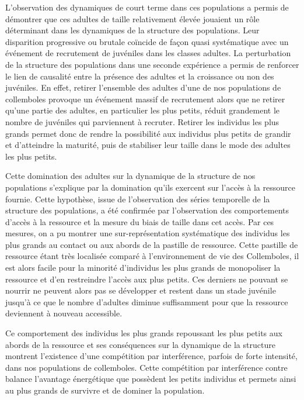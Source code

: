 L'observation des dynamiques de court terme dans ces populations a permis de
démontrer que ces adultes de taille relativement élevée jouaient un rôle
déterminant dans les dynamiques de la structure des populations. Leur
disparition progressive ou brutale coïncide de façon quasi systématique avec un
événement de recrutement de juvéniles dans les classes adultes. La perturbation
de la structure des populations dans une seconde expérience a permis de
renforcer le lien de causalité entre la présence des adultes et la croissance ou
non des juvéniles. En effet, retirer l'ensemble des adultes d'une de nos
populations de collemboles provoque un événement massif de recrutement alors que
ne retirer qu'une partie des adultes, en particulier les plus petits, réduit
grandement le nombre de juvéniles qui parviennent à recruter. Retirer les
individus les plus grands permet donc de rendre la possibilité aux individus
plus petits de grandir et d'atteindre la maturité, puis de stabiliser leur
taille dans le mode des adultes les plus petits. 

Cette domination des adultes sur la dynamique de la structure de nos populations
s'explique par la domination qu'ils exercent sur l'accès à la ressource fournie.
Cette hypothèse, issue de l'observation des séries temporelle de la structure
des populations, a été confirmée par l'observation des comportements d'accès à
la ressource et la mesure du biais de taille dans cet accès. Par ces mesures, on
a pu montrer une sur-représentation systématique des individus les plus grands
au contact ou aux abords de la pastille de ressource. Cette pastille de
ressource étant très localisée comparé à l'environnement de vie des Collemboles,
il est alors facile pour la minorité d'individus les plus grands de monopoliser
la ressource et d'en restreindre l'accès aux plus petits. Ces derniers ne
pouvant se nourrir ne peuvent alors pas se développer et restent dans un stade
juvénile jusqu'à ce que le nombre d'adultes diminue suffisamment pour que la
ressource deviennent à nouveau accessible. 

Ce comportement des individus les plus grands repoussant les plus petits aux
abords de la ressource et ses conséquences sur la dynamique de la structure
montrent l'existence d'une compétition par interférence, parfois de forte
intensité, dans nos populations de collemboles. Cette compétition par
interférence contre balance l'avantage énergétique que possèdent les petits
individus et permets ainsi au plus grands de survivre et de dominer la
population. 

